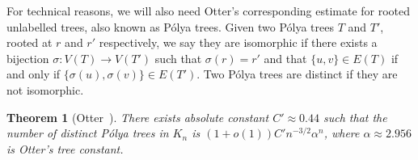 \documentclass[reqno,final,a4paper]{amsart}
\numberwithin{equation}{section}
\newtheorem{theorem}{Theorem}[section]
\theoremstyle{definition}
\theoremstyle{remark}
\begin{document}
For technical reasons, we will also need Otter's corresponding estimate for rooted unlabelled trees, also known as Pólya trees. Given two Pólya trees $T$ and $T'$, rooted at $r$ and $r'$ respectively, we say they are isomorphic if there exists a bijection $\sigma: V(T)\rightarrow V(T')$ such that $\sigma(r) = r'$ and that $\{u,v\}\in E(T)$ if and only if $\{\sigma(u),\sigma(v)\}\in E(T')$. Two Pólya trees are distinct if they are not isomorphic. 

\begin{theorem}[Otter~\cite{Otter}]\label{thm:Otter-unlabelled}
    There exists absolute constant $C' \approx 0.44$ such that the number of distinct Pólya trees in $K_n$ is $(1+o(1))C'n^{-3/2} \alpha^n$, where $\alpha\approx 2.956$ is Otter's tree constant.
\end{theorem}
\end{document}
